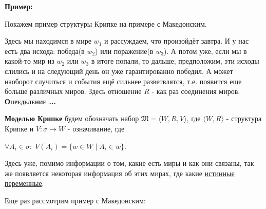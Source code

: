\documentclass[18pt, a4paper]{extarticle}
\newcounter{par}
\newcounter{spar}
\newcounter{zap}
\newcommand{\opr}{\textbf{\textsc{Определение \thepar.\if\thespar1\thespar.\fi\thezap.\;}}\stepcounter{zap}}
\newcommand{\primer}{\textbf{Пример:\;}}
\newcommand{\mM}{\mathfrak{M}}
\newcommand{\sg}{\sigma}
\begin{document}
\primer

Покажем пример структуры Крипке на примере с Македонским.

\begin{center}
\end{center}

Здесь мы находимся в мире $w_1$ и рассуждаем, что произойдёт завтра. И у нас есть два исхода: победа(в $w_2$) или поражение(в $w_3$). А потом уже, если мы в какой-то мир из $w_2$ или $w_3$ в итоге попали, то дальше, предположим, эти исходы слились и на следующий день он уже гарантированно победил. А может наоборот случиться и события ещё сильнее разветвлятся, т.е. появится еще больше различных миров. Здесь отношение $R$ - как раз соединения миров.\\

\opr 

\textbf{Моделью Крипке} будем обозначать набор $\mM=\langle W,R,V\rangle$, где $\langle W,R\rangle$ - структура Крипке и $V\!\!:\sg\to W$ - означивание, где 
\begin{center}
    $\forall A_i\in\sg\!:\;V(A_i)=\{w\in W\;|\;A_i\in w\}$.
\end{center}

Здесь уже, помимо информации о том, какие есть миры и как они связаны, так же появляется некоторая информация об этих мирах, где какие \underline{истинные переменные}.

Еще раз рассмотрим пример с Македонским:
\end{document}
